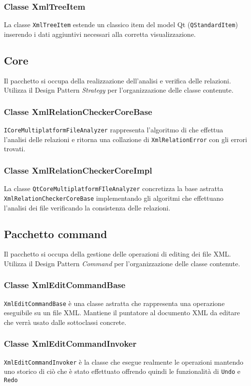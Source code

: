 	\subsubsection{Classe XmlTreeItem}
		La classe \texttt{XmlTreeItem} estende un classico item del model Qt (\texttt{QStandardItem}) inserendo i dati aggiuntivi necessari alla corretta visualizzazione.

\subsection{Core}
	Il pacchetto si occupa della realizzazione dell'analisi e verifica delle relazioni. Utilizza il Design Pattern \textit{Strategy} per l'organizzazione delle classe contenute.

	\subsubsection{Classe XmlRelationCheckerCoreBase}
		\texttt{ICoreMultiplatformFileAnalyzer} rappresenta l'algoritmo di che effettua l'analisi delle relazioni e ritorna una collazione di \texttt{XmlRelationError} con gli errori trovati.
	
	\subsubsection{Classe XmlRelationCheckerCoreImpl}
		La classe \texttt{QtCoreMultiplatformFIleAnalyzer} concretizza la base astratta \texttt{XmlRelationCheckerCoreBase} implementando gli algoritmi che effettuano l'analisi dei file verificando la consistenza delle relazioni.

\subsection{Pacchetto command}
Il pacchetto si occupa della gestione delle operazioni di editing dei file XML. Utilizza il Design Pattern \textit{Command} per l'organizzazione delle classe contenute.

	\subsubsection{Classe XmlEditCommandBase}
		\texttt{XmlEditCommandBase} è una classe astratta che rappresenta una operazione eseguibile su un file XML. Mantiene il puntatore al documento XML da editare che verrà usato dalle sottoclassi concrete.
		
	\subsubsection{Classe XmlEditCommandInvoker}
		\texttt{XmlEditCommandInvoker} è la classe che esegue realmente le operazioni mantendo uno storico di ciò che è stato effettuato offrendo quindi le funzionalità di \texttt{Undo} e \texttt{Redo}

